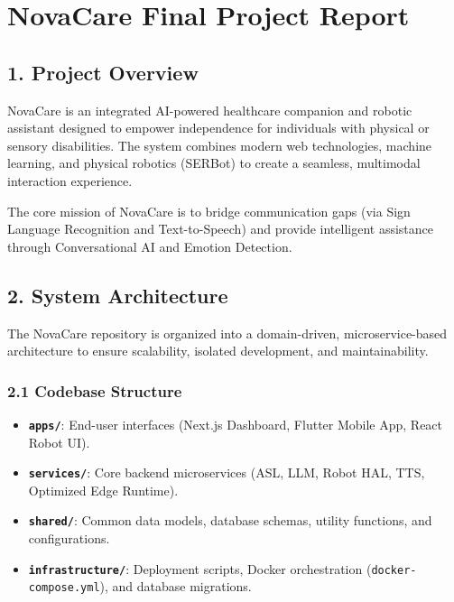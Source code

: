 \documentclass[
]{article}
\author{}
\date{}
\providecommand{\tightlist}{%
  \setlength{\itemsep}{0pt}\setlength{\parskip}{0pt}}
\begin{document}
\section{NovaCare Final Project
Report}\label{novacare-final-project-report}

\subsection{1. Project Overview}\label{project-overview}

NovaCare is an integrated AI-powered healthcare companion and robotic
assistant designed to empower independence for individuals with physical
or sensory disabilities. The system combines modern web technologies,
machine learning, and physical robotics (SERBot) to create a seamless,
multimodal interaction experience.

The core mission of NovaCare is to bridge communication gaps (via Sign
Language Recognition and Text-to-Speech) and provide intelligent
assistance through Conversational AI and Emotion Detection.

\subsection{2. System Architecture}\label{system-architecture}

The NovaCare repository is organized into a domain-driven,
microservice-based architecture to ensure scalability, isolated
development, and maintainability.

\subsubsection{2.1 Codebase Structure}\label{codebase-structure}

\begin{itemize}
\tightlist
\item
  \textbf{\texttt{apps/}}: End-user interfaces (Next.js Dashboard,
  Flutter Mobile App, React Robot UI).
\item
  \textbf{\texttt{services/}}: Core backend microservices (ASL, LLM,
  Robot HAL, TTS, Optimized Edge Runtime).
\item
  \textbf{\texttt{shared/}}: Common data models, database schemas,
  utility functions, and configurations.
\item
  \textbf{\texttt{infrastructure/}}: Deployment scripts, Docker
  orchestration (\texttt{docker-compose.yml}), and database migrations.
\end{itemize}
\end{document}
